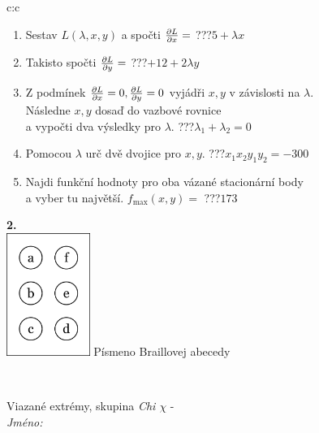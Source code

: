 \documentclass[10pt]{report}
\begin{document}
\begin{tabular}{c:c}
\begin{minipage}[c][104.5mm][t]{0.5\linewidth}
\begin{center}
\begin{minipage}{0.79\linewidth}
\begin{center}
\begin{varwidth}{\linewidth}
\begin{enumerate}
\item Sestav $L(\lambda,x,y)$ a spočti $\pdv{L}{x}=$\quad \dotfill\; ???\;\dotfill \quad $5+\lambda x$
\item Takisto spočti $\pdv{L}{y}=$\quad \dotfill\; ???\;\dotfill \quad $+12+2\lambda y$
\item Z podmínek $\pdv{L}{x}=0 , \pdv{L}{y}=0$ vyjádři $x,y$ v závislosti na $\lambda$.\\ \phantom{xxxxxx}Následne $x,y$ dosaď do vazbové rovnice\\ \phantom{xxxxxx}a vypočti dva výsledky pro $\lambda$.\quad \dotfill\; ???\;\dotfill \quad $\lambda_1+\lambda_2=0$
\item Pomocou $\lambda$ urč dvě dvojice pro $x,y$.\quad \dotfill\; ???\;\dotfill \quad $x_1 x_2 y_1 y_2=-300$
\item Najdi funkční hodnoty pro oba vázané stacionární body\\ \phantom{xxxxxx}a vyber tu najvětší. $f_{\text{max}}(x,y)=$\quad \dotfill\; ???\;\dotfill \quad $173$
\end{enumerate}
\end{varwidth}
\end{center}
\end{minipage}
\begin{minipage}{0.20\linewidth}
\begin{center}
{\Huge\bfseries 2.} \\[2mm]
\includegraphics[height=40mm]{../images/braille.png}
{\small Písmeno Braillovej abecedy}
\end{center}
\end{minipage}
\end{center}
\end{minipage}
\\ \hdashline
\begin{minipage}[c][104.5mm][t]{0.5\linewidth}
\begin{center}
\vspace{7mm}
{\huge Viazané extrémy, skupina \textit{Chi $\chi$} -}\\[5mm]
\textit{Jméno:}\phantom{xxxxxxxxxxxxxxxxxxxxxxxxxxxxxxxxxxxxxxxxxxxxxxxxxxxxxxxxxxxxxxxxx}\\[5mm]

\end{center}
\end{minipage}
\end{tabular}
\end{document}
